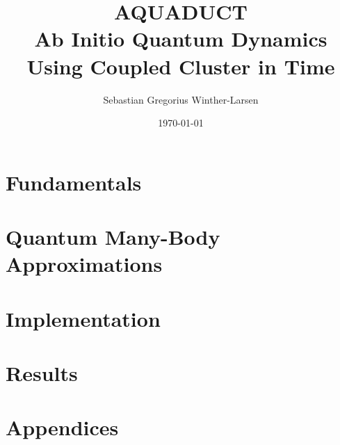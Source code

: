 \documentclass[twoside, english, notitlepage, 10pt]{uiofysmaster}
\author{Sebastian Gregorius Winther-Larsen}
\title{\textbf{AQUADUCT} \\ 
    \textbf{A}b Initio \textbf{Qua}ntum 
    \textbf{D}ynamics \\ \textbf{U}sing 
    \textbf{C}oupled Cluster in 
    \textbf{T}ime
}
\date{\today}
\begin{document}
\frontmatter
    \maketitle

    \tableofcontents

\mainmatter

    \part{Fundamentals}

        
        

    \part{Quantum Many-Body Approximations}

        
        
        

    \part{Implementation}

        
         
    
    \part{Results}
        
        

    \part{Appendices}
    \appendix

        
        
        
        
        

    \printbibliography
\end{document}
